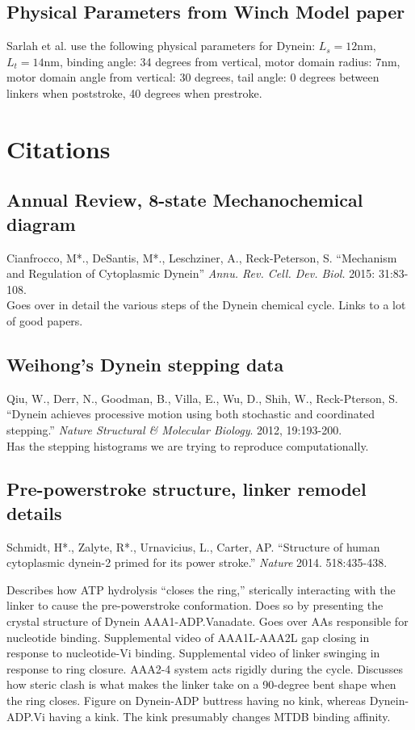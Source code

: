 \documentclass[10pt]{article} %
\begin{document}
\subsection{Physical Parameters from Winch Model paper}
Sarlah et al. use the following physical parameters for Dynein: $L_s = 12$nm, $L_t = 14$nm, binding angle: 34 degrees from vertical, motor
domain radius: 7nm, motor domain angle from vertical: 30 degrees, tail angle: 0 degrees between linkers when poststroke, 40 degrees when prestroke.

\section{Citations}
\subsection{Annual Review, 8-state Mechanochemical diagram}
Cianfrocco, M*., DeSantis, M*., Leschziner, A., Reck-Peterson, S. ``Mechanism and Regulation of Cytoplasmic Dynein'' \textit{Annu. Rev. Cell. Dev. Biol.} 2015: 31:83-108.\\

Goes over in detail the various steps of the Dynein chemical cycle. Links to a lot of good papers.\\

\subsection{Weihong's Dynein stepping data}
Qiu, W., Derr, N., Goodman, B., Villa, E., Wu, D., Shih, W., Reck-Pterson, S. ``Dynein achieves processive motion using both stochastic and coordinated stepping.'' \textit{Nature Structural & Molecular Biology}. 2012, 19:193-200.\\

Has the stepping histograms we are trying to reproduce computationally.

\subsection{Pre-powerstroke structure, linker remodel details}
Schmidt, H*., Zalyte, R*., Urnavicius, L., Carter, AP. ``Structure of human cytoplasmic dynein-2 primed for its power stroke.'' \textit{Nature} 2014. 518:435-438.

Describes how ATP hydrolysis ``closes the ring,'' sterically interacting with the linker to cause the pre-powerstroke conformation. Does so by presenting the crystal structure of Dynein AAA1-ADP.Vanadate. Goes over AAs responsible for nucleotide binding. Supplemental video of AAA1L-AAA2L gap closing in response to nucleotide-Vi binding. Supplemental video of linker swinging in response to ring closure. AAA2-4 system acts rigidly during the cycle. Discusses how steric clash is what makes the linker take on a 90-degree bent shape when the ring closes. Figure on Dynein-ADP buttress having no kink, whereas Dynein-ADP.Vi having a kink. The kink presumably changes MTDB binding affinity.
\end{document}
